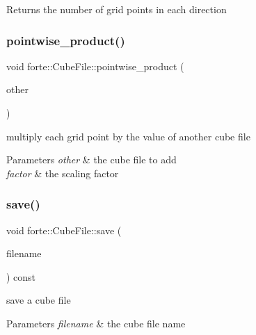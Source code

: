 \begin{DoxyReturn}{Returns}
the number of grid points in each direction 
\end{DoxyReturn}
\mbox{\label{classforte_1_1_cube_file_af35406d88fc10f10ed1cf162d395a5f2}} 
\subsubsection{\texorpdfstring{pointwise\+\_\+product()}{pointwise\_product()}}
{\footnotesize\ttfamily void forte\+::\+Cube\+File\+::pointwise\+\_\+product (\begin{DoxyParamCaption}\item[{const \mbox{\hyperlink{classforte_1_1_cube_file}{Cube\+File}} \&}]{other }\end{DoxyParamCaption})}



multiply each grid point by the value of another cube file 


\begin{DoxyParams}{Parameters}
{\em other} & the cube file to add \\
\hline
{\em factor} & the scaling factor \\
\hline
\end{DoxyParams}
\mbox{\label{classforte_1_1_cube_file_ac45d60ce3490487dd948a4ef9d3d3730}} 
\subsubsection{\texorpdfstring{save()}{save()}}
{\footnotesize\ttfamily void forte\+::\+Cube\+File\+::save (\begin{DoxyParamCaption}\item[{std\+::string}]{filename }\end{DoxyParamCaption}) const}

save a cube file 
\begin{DoxyParams}{Parameters}
{\em filename} & the cube file name \\
\hline
\end{DoxyParams}
\mbox{\label{classforte_1_1_cube_file_af0841a7b1389699679bae67a8027d501}} 
